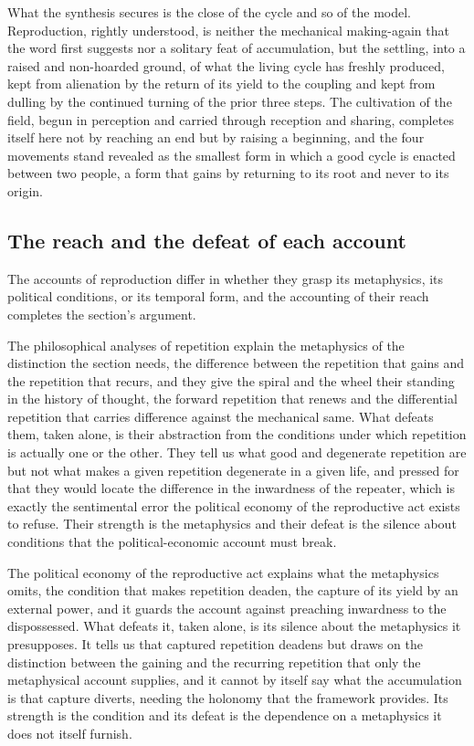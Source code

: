 What the synthesis secures is the close of the cycle and so of the model. Reproduction, rightly understood, is neither the mechanical making-again that the word first suggests nor a solitary feat of accumulation, but the settling, into a raised and non-hoarded ground, of what the living cycle has freshly produced, kept from alienation by the return of its yield to the coupling and kept from dulling by the continued turning of the prior three steps. The cultivation of the field, begun in perception and carried through reception and sharing, completes itself here not by reaching an end but by raising a beginning, and the four movements stand revealed as the smallest form in which a good cycle is enacted between two people, a form that gains by returning to its root and never to its origin.

\subsection{The reach and the defeat of each account}
\label{p22:sub:reproduction-ledger}

The accounts of reproduction differ in whether they grasp its metaphysics, its political conditions, or its temporal form, and the accounting of their reach completes the section's argument.

The philosophical analyses of repetition explain the metaphysics of the distinction the section needs, the difference between the repetition that gains and the repetition that recurs, and they give the spiral and the wheel their standing in the history of thought, the forward repetition that renews and the differential repetition that carries difference against the mechanical same. What defeats them, taken alone, is their abstraction from the conditions under which repetition is actually one or the other. They tell us what good and degenerate repetition are but not what makes a given repetition degenerate in a given life, and pressed for that they would locate the difference in the inwardness of the repeater, which is exactly the sentimental error the political economy of the reproductive act exists to refuse. Their strength is the metaphysics and their defeat is the silence about conditions that the political-economic account must break.

The political economy of the reproductive act explains what the metaphysics omits, the condition that makes repetition deaden, the capture of its yield by an external power, and it guards the account against preaching inwardness to the dispossessed. What defeats it, taken alone, is its silence about the metaphysics it presupposes. It tells us that captured repetition deadens but draws on the distinction between the gaining and the recurring repetition that only the metaphysical account supplies, and it cannot by itself say what the accumulation is that capture diverts, needing the holonomy that the framework provides. Its strength is the condition and its defeat is the dependence on a metaphysics it does not itself furnish.

